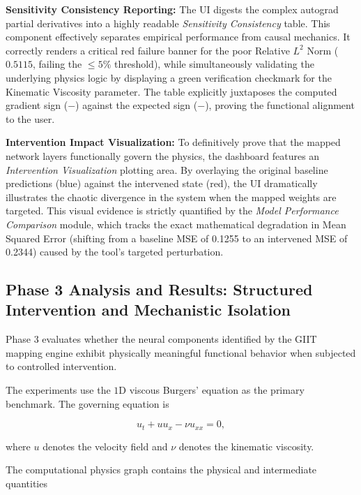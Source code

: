 \documentclass[12pt,singleside,a4paper]{article}
\begin{document}
\textbf{Sensitivity Consistency Reporting:}
The UI digests the complex autograd partial derivatives into a highly readable \textit{Sensitivity Consistency} table. This component effectively separates empirical performance from causal mechanics. It correctly renders a critical red failure banner for the poor Relative $L^2$ Norm ($0.5115$, failing the $\le 5\%$ threshold), while simultaneously validating the underlying physics logic by displaying a green verification checkmark for the Kinematic Viscosity parameter. The table explicitly juxtaposes the computed gradient sign ($-$) against the expected sign ($-$), proving the functional alignment to the user.

\textbf{Intervention Impact Visualization:}
To definitively prove that the mapped network layers functionally govern the physics, the dashboard features an \textit{Intervention Visualization} plotting area. By overlaying the original baseline predictions (blue) against the intervened state (red), the UI dramatically illustrates the chaotic divergence in the system when the mapped weights are targeted. This visual evidence is strictly quantified by the \textit{Model Performance Comparison} module, which tracks the exact mathematical degradation in Mean Squared Error (shifting from a baseline MSE of 0.1255 to an intervened MSE of 0.2344) caused by the tool's targeted perturbation.


\subsection{Phase 3 Analysis and Results: Structured Intervention and
Mechanistic Isolation}

Phase 3 evaluates whether the neural components identified by the
GIIT mapping engine exhibit physically meaningful functional behavior
when subjected to controlled intervention.

The experiments use the $1$D viscous Burgers' equation as the primary
benchmark. The governing equation is

\begin{equation}
    u_t + u u_x - \nu u_{xx} = 0,
\end{equation}

where $u$ denotes the velocity field and $\nu$ denotes the kinematic
viscosity.

The computational physics graph contains the physical and intermediate
quantities
\end{document}
